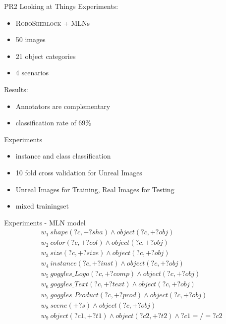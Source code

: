 \documentclass[]{beamer}
\begin{document}
\begin{frame}{PR2 Looking at Things}
Experiments:
	\begin{itemize}
		\item \textsc{RoboSherlock} + MLNs
		\item 50 images 
		\item 21 object categories
		\item 4 scenarios
	\end{itemize}
\bigskip
Results:
	\begin{itemize}
		\item Annotators are complementary
		\item classification rate of 69\%
	\end{itemize}
\end{frame}

\begin{frame}{Experiments}
	\begin{itemize}
		\item instance and class classification
		\item 10 fold cross validation for Unreal Images
		\item Unreal Images for Training, Real Images for Testing
		\item mixed trainingset
	\end{itemize}
\end{frame}

\begin{frame}{Experiments - MLN model}
\begin{align*}
& w_{1} \ shape(?c, +?sha) \wedge object(?c, +?obj) \\
& w_{2} \ color(?c, +?col) \wedge object(?c, +?obj) \\
& w_{3} \ size(?c, +?size) \wedge object(?c, +?obj) \\
& w_{4} \ instance(?c, +?inst) \wedge object(?c, +?obj) \\
& w_{5} \ goggles\_Logo(?c, +?comp) \wedge object(?c, +?obj)\\
& w_{6} \ goggles\_Text(?c, +?text) \wedge object(?c, +?obj)\\
& w_{7} \ goggles\_Product(?c, +?prod) \wedge object(?c, +?obj)\\
& w_{8} \ scene(+?s) \wedge object(?c, +?obj)\\
& w_{9} \ object(?c1, +?t1) \wedge object(?c2, +?t2) \wedge ?c1 =/= ?c2
\end{align*}

\end{frame}
\end{document}
